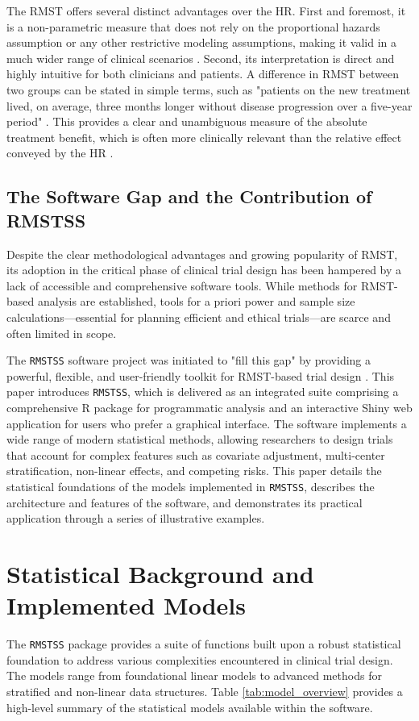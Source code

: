 \documentclass[article]{jss}
\begin{document}
The RMST offers several distinct advantages over the HR. First and foremost, it is a non-parametric measure that does not rely on the proportional hazards assumption or any other restrictive modeling assumptions, making it valid in a much wider range of clinical scenarios \cite{[1]}. Second, its interpretation is direct and highly intuitive for both clinicians and patients. A difference in RMST between two groups can be stated in simple terms, such as "patients on the new treatment lived, on average, three months longer without disease progression over a five-year period" \cite{[1]}. This provides a clear and unambiguous measure of the absolute treatment benefit, which is often more clinically relevant than the relative effect conveyed by the HR \cite{[1]}.

\subsection{The Software Gap and the Contribution of RMSTSS}
Despite the clear methodological advantages and growing popularity of RMST, its adoption in the critical phase of clinical trial design has been hampered by a lack of accessible and comprehensive software tools. While methods for RMST-based analysis are established, tools for a priori power and sample size calculations—essential for planning efficient and ethical trials—are scarce and often limited in scope.

The \texttt{RMSTSS} software project was initiated to "fill this gap" by providing a powerful, flexible, and user-friendly toolkit for RMST-based trial design \cite{[1]}. This paper introduces \texttt{RMSTSS}, which is delivered as an integrated suite comprising a comprehensive R package for programmatic analysis and an interactive Shiny web application for users who prefer a graphical interface. The software implements a wide range of modern statistical methods, allowing researchers to design trials that account for complex features such as covariate adjustment, multi-center stratification, non-linear effects, and competing risks. This paper details the statistical foundations of the models implemented in \texttt{RMSTSS}, describes the architecture and features of the software, and demonstrates its practical application through a series of illustrative examples.

\section{Statistical Background and Implemented Models}
The \texttt{RMSTSS} package provides a suite of functions built upon a robust statistical foundation to address various complexities encountered in clinical trial design. The models range from foundational linear models to advanced methods for stratified and non-linear data structures. Table \ref{tab:model_overview} provides a high-level summary of the statistical models available within the software.
\end{document}
